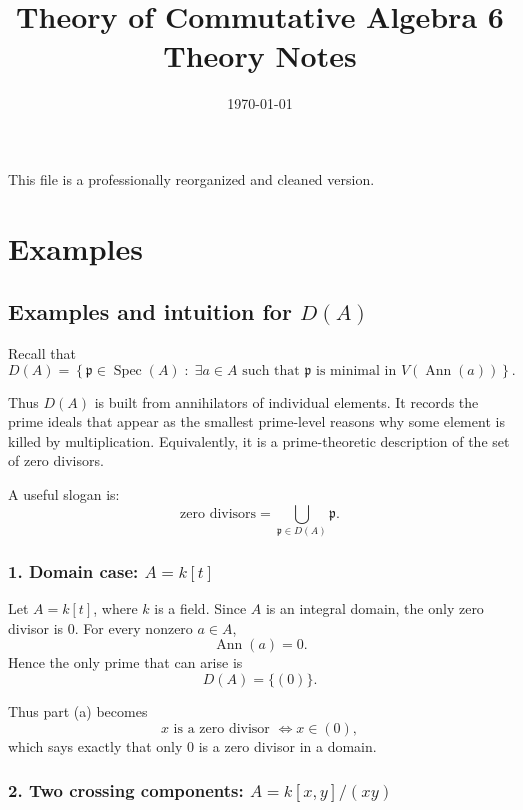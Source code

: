 \documentclass[12pt,a4paper,oneside]{report}
\title{\bfseries Theory of Commutative Algebra 6 Theory Notes}
\author{}
\date{\today}
\DeclareMathOperator{\Spec}{Spec}
\DeclareMathOperator{\Ann}{Ann}
\theoremstyle{notespace}
\begin{document}
	\maketitle
	\thispagestyle{plain}
	
	\begin{center}
		\begin{minipage}{0.92\textwidth}
			This file is a professionally reorganized and cleaned version. 
		\end{minipage}
	\end{center}
	
	\tableofcontents
	\clearpage
	
	
\chapter{Examples}
	
	\section{Examples and intuition for \(D(A)\)}
	
	Recall that
	\[
	D(A)=\left\{\mathfrak p\in \Spec(A)\;:\;\exists a\in A \text{ such that }
	\mathfrak p \text{ is minimal in }V(\Ann(a))\right\}.
	\]
	
	Thus \(D(A)\) is built from annihilators of individual elements. It records the prime ideals
	that appear as the smallest prime-level reasons why some element is killed by multiplication.
	Equivalently, it is a prime-theoretic description of the set of zero divisors.
	
	A useful slogan is:
	\[
	\text{zero divisors}=\bigcup_{\mathfrak p\in D(A)}\mathfrak p.
	\]
	
	\subsection{1. Domain case: \(A=k[t]\)}
	
	Let \(A=k[t]\), where \(k\) is a field. Since \(A\) is an integral domain, the only zero divisor is \(0\).
	For every nonzero \(a\in A\),
	\[
	\Ann(a)=0.
	\]
	Hence the only prime that can arise is
	\[
	D(A)=\{(0)\}.
	\]
	
	Thus part (a) becomes
	\[
	x \text{ is a zero divisor } \iff x\in (0),
	\]	which says exactly that only \(0\) is a zero divisor in a domain.
	
	\subsection{2. Two crossing components: \(A=k[x,y]/(xy)\)}
	
\end{document}
